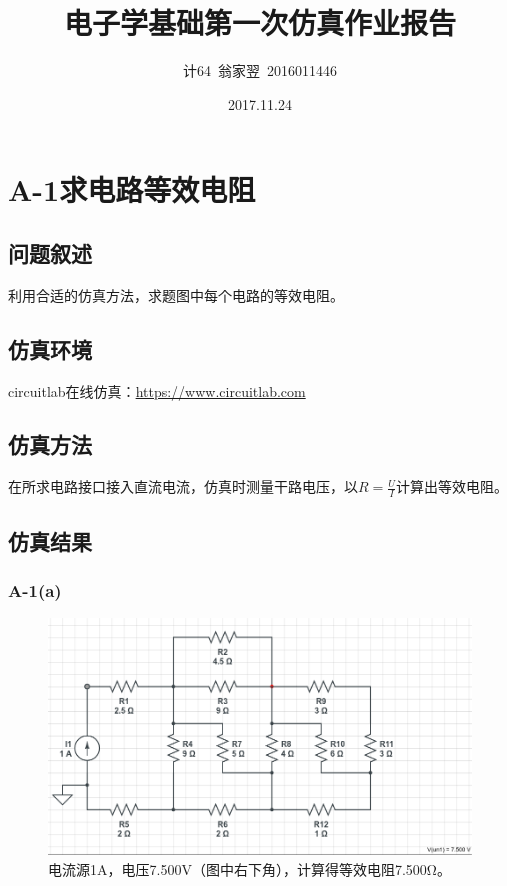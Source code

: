 \documentclass[a4paper]{article}
\title{\bf 电子学基础第一次仿真作业报告}
\date{2017.11.24}
\author{计64~翁家翌~2016011446}
\begin{document}
\kaishu
\ttfamily
\maketitle
\section{A-1求电路等效电阻}
\subsection{问题叙述}
利用合适的仿真方法，求题图中每个电路的等效电阻。
\subsection{仿真环境}
circuitlab在线仿真：\url{https://www.circuitlab.com}
\subsection{仿真方法}
在所求电路接口接入直流电流，仿真时测量干路电压，以$R=\frac{U}{I}$计算出等效电阻。
\subsection{仿真结果}
\subsubsection{A-1(a)}
\begin{figure}[htp]
\centering
\includegraphics[width=1\linewidth]{A1.png}
\caption{电流源1A，电压7.500V（图中右下角），计算得等效电阻7.500Ω。}
\label{A1a}
\end{figure}
\end{document}
